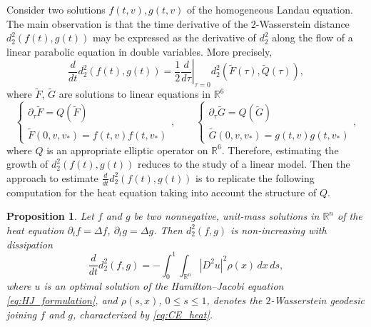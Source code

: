 \documentclass[10pt,oneside]{amsart}
\numberwithin{equation}{section}
\numberwithin{definition}{section}
\numberwithin{theorem}{section}
\newtheorem*{proposition*}{Proposition}
\numberwithin{lemma}{section}
\begin{document}
Consider two solutions $f(t,v),g(t,v)$ of the homogeneous Landau equation. The main observation is that the time derivative of the $2$-Wasserstein distance $d_2^2(f(t),g(t))$ may be expressed as the derivative of $d_2^2$ along the flow of a linear parabolic equation in double variables. More precisely,
%
\begin{equation*}
  \frac{d}{dt}d_2^2(f(t),g(t)) = \frac{1}{2}\left.\frac{d}{d\tau}\right|_{\tau = 0}d_2^2(\tilde F(\tau),\tilde Q(\tau)),
\end{equation*}
%
where $\tilde F$, $\tilde G$ are solutions to linear equations in $\mathbb R^6$
%
\begin{equation*}
  \begin{cases}
    \partial_\tau \tilde F = Q(\tilde F)\\
    \tilde F(0,v,v_*) = f(t,v)f(t,v_*)
  \end{cases},\qquad
  \begin{cases}
    \partial_\tau \tilde G = Q(\tilde G)\\
    \tilde G(0,v,v_*) = g(t,v)g(t,v_*)
  \end{cases},
\end{equation*}
%
where $Q$ is an appropriate elliptic operator on $\mathbb R^6$. Therefore, estimating the growth of $d_2^2(f(t),g(t))$ reduces to the study of a linear model. Then the approach to estimate $\frac{d}{dt}d_2^2(f(t),g(t))$ is to replicate the following computation for the heat equation taking into account the structure of $Q$.
% 
\begin{proposition*}
  Let $f$ and $g$ be two nonnegative, unit-mass solutions in $\mathbb R^n$ of the heat equation $\partial_t f = \Delta f$, $\partial_t g = \Delta g$. Then  $d_2^2(f,g)$ is non-increasing with dissipation
  \begin{equation*}
    \frac{d}{dt} d_2^2(f,g) = -\int_0^1\int_{\mathbb{R}^n}\left|D^2u\right|^2\rho(x)\,dx\,ds,
  \end{equation*}
  where $u$ is an optimal solution of the Hamilton–Jacobi equation \eqref{eq:HJ_formulation}, and $\rho(s,x)$, $0\leq s \leq 1$, denotes the $2$-Wasserstein geodesic joining $f$ and $g$, characterized by \eqref{eq:CE_heat}.
\end{proposition*}
% 
\end{document}
